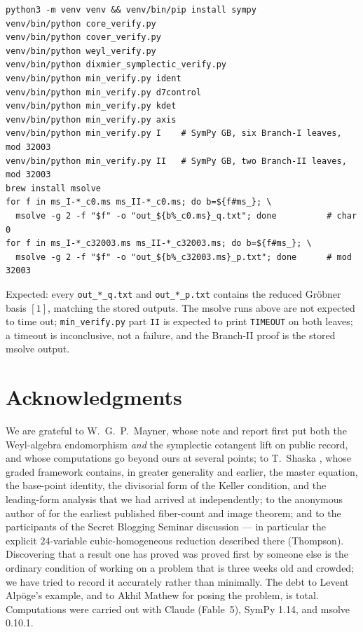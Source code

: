 \documentclass[11pt]{amsart}
\theoremstyle{plain}
\theoremstyle{definition}
\theoremstyle{remark}
\begin{document}
\begin{verbatim}
python3 -m venv venv && venv/bin/pip install sympy
venv/bin/python core_verify.py
venv/bin/python cover_verify.py
venv/bin/python weyl_verify.py
venv/bin/python dixmier_symplectic_verify.py
venv/bin/python min_verify.py ident
venv/bin/python min_verify.py d7control
venv/bin/python min_verify.py kdet
venv/bin/python min_verify.py axis
venv/bin/python min_verify.py I    # SymPy GB, six Branch-I leaves, mod 32003
venv/bin/python min_verify.py II   # SymPy GB, two Branch-II leaves, mod 32003
brew install msolve
for f in ms_I-*_c0.ms ms_II-*_c0.ms; do b=${f#ms_}; \
  msolve -g 2 -f "$f" -o "out_${b%_c0.ms}_q.txt"; done          # char 0
for f in ms_I-*_c32003.ms ms_II-*_c32003.ms; do b=${f#ms_}; \
  msolve -g 2 -f "$f" -o "out_${b%_c32003.ms}_p.txt"; done      # mod 32003
\end{verbatim}
Expected: every \texttt{out\_*\_q.txt} and \texttt{out\_*\_p.txt} contains
the reduced Gr\"obner basis $[1]$, matching the stored outputs. The msolve
runs above are not expected to time out; \texttt{min\_verify.py} part
\texttt{II} is expected to print \texttt{TIMEOUT} on both leaves; a
timeout is inconclusive, not a failure, and the Branch-II proof is the
stored msolve output.

\section*{Acknowledgments}
We are grateful to W.~G.~P.~Mayner, whose note and report \cite{Mayner26}
first put both the Weyl-algebra endomorphism \emph{and} the symplectic
cotangent lift on public record, and whose computations go beyond ours at
several points; to T.~Shaska \cite{Shaska26}, whose graded framework
contains, in greater generality and earlier, the master equation, the
base-point identity, the divisorial form of the Keller condition, and the
leading-form analysis that we had arrived at independently; to the
anonymous author of \cite{Ulam26} for the earliest published fiber-count
and image theorem; and to the participants of the Secret Blogging Seminar
discussion \cite{Speyer26} --- in particular the explicit $24$-variable
cubic-homogeneous reduction described there (Thompson). Discovering that a
result one has proved was proved first by someone else is the ordinary
condition of working on a problem that is three weeks old and crowded; we
have tried to record it accurately rather than minimally. The debt to
Levent Alp\"oge's example, and to Akhil Mathew for posing the problem, is
total. Computations were carried out with Claude (Fable~5), SymPy 1.14,
and msolve 0.10.1.
\end{document}
